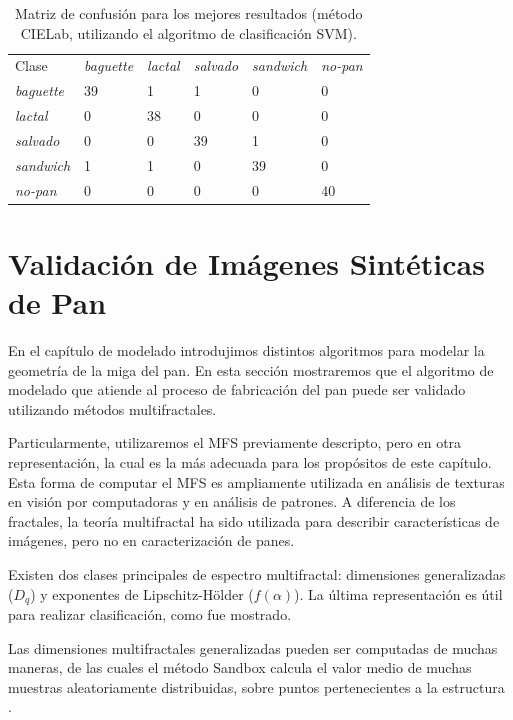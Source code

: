 \begin{table}[h!]
\center
\caption{Matriz de confusión para los mejores resultados (método CIELab, utilizando el algoritmo de clasificación SVM).}
\label{tab:confusionmatrix}       %
\begin{tabular}{llllll}
\hline\noalign{\smallskip}
Clase&{\em baguette} & {\em lactal} & {\em salvado} &{\em sandwich}&{\em no-pan} \\
\noalign{\smallskip}\hline\noalign{\smallskip}
{\em baguette} & 39& 1 &1 &0 &0 \\
{\em lactal} & 0& 38 &0 &0 &0  \\
{\em salvado} & 0& 0 &39 &1 &0  \\
{\em sandwich} & 1& 1 &0 &39 &0  \\
{\em no-pan} & 0& 0 &0 &0 &40  \\
\hline
\end{tabular}
\end{table}


\section{Validación de Imágenes Sintéticas de Pan}

En el capítulo de modelado introdujimos distintos algoritmos para modelar la geometría de la miga del pan.
En esta sección mostraremos que el algoritmo de modelado que atiende al proceso de fabricación del pan puede ser validado utilizando métodos multifractales.

Particularmente, utilizaremos el MFS previamente descripto, pero en otra representación, la cual es la más adecuada para los propósitos de este capítulo.
Esta forma de computar el MFS es ampliamente utilizada en análisis de texturas en visión por computadoras y en análisis de patrones.
A diferencia de los fractales\cite{Gonzales2008}, la teoría multifractal ha sido utilizada para describir características de imágenes, pero no en caracterización de panes.

Existen dos clases principales de espectro multifractal: dimensiones generalizadas ($D_{q}$) y exponentes de Lipschitz-H\"older ($f(\alpha)$). 
La última representación es útil para realizar clasificación, como fue mostrado.

Las dimensiones multifractales generalizadas pueden ser computadas de muchas maneras, de las cuales el método Sandbox \cite{Tel1989} calcula el valor medio de muchas muestras aleatoriamente distribuidas, sobre puntos pertenecientes a la estructura \cite{Debartolo2004}. 

